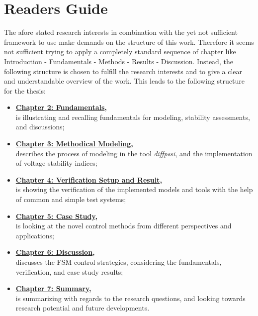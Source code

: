 \section{Readers Guide}

The afore stated research interests in combination with the yet not sufficient framework to use make demands on the structure of this work. 
Therefore it seems not sufficient trying to apply a completely standard sequence of chapter like \glqq Introduction - Fundamentals - Methods - Results - Discussion\grqq.
Instead, the following structure is chosen to fulfill the research interests and to give a clear and understandable overview of the work.
This leads to the following structure for the thesis: 
\begin{itemize}
    \item \textbf{\hyperref[chap:fundamentals]{Chapter 2: Fundamentals},}\\
    is illustrating and recalling fundamentals for modeling, stability assessments, and discussions;
    \item \textbf{\hyperref[chap:methodical-modeling]{Chapter 3: Methodical Modeling},}\\
    describes the process of modeling in the tool \textit{diffpssi}, and the implementation of voltage stability indices;
    \item \textbf{\hyperref[chap:verification]{Chapter 4: Verification Setup and Result},}\\
    is showing the verification of the implemented models and tools with the help of common and simple test systems;
    \item \textbf{\hyperref[chap:case-study]{Chapter 5: Case Study},}\\
    is looking at the novel control methods from different perspectives and applications; 
    \item \textbf{\hyperref[chap:discussion]{Chapter 6: Discussion},}\\
    discusses the FSM control strategies, considering the fundamentals, verification, and case study results;
    \item \textbf{\hyperref[chap:summary]{Chapter 7: Summary},}\\
    is summarizing with regards to the research questions, and looking towards research potential and future developments. 
\end{itemize}

